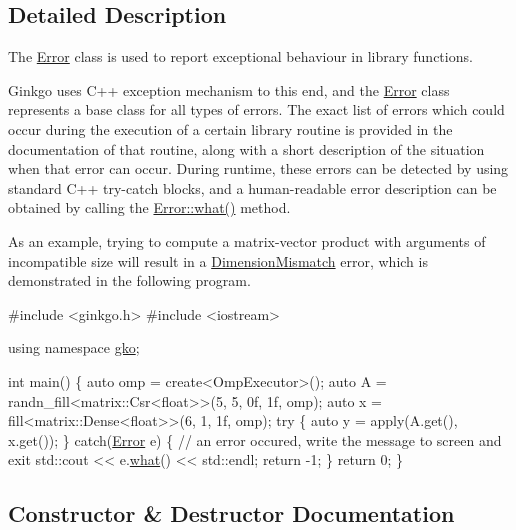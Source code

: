 \subsection{Detailed Description}
The \hyperlink{classgko_1_1Error}{Error} class is used to report exceptional behaviour in library functions. 

Ginkgo uses C++ exception mechanism to this end, and the \hyperlink{classgko_1_1Error}{Error} class represents a base class for all types of errors. The exact list of errors which could occur during the execution of a certain library routine is provided in the documentation of that routine, along with a short description of the situation when that error can occur. During runtime, these errors can be detected by using standard C++ try-\/catch blocks, and a human-\/readable error description can be obtained by calling the \hyperlink{classgko_1_1Error_a38cf4e9e4463088091a344f218c2dd8f}{Error\+::what()} method.

As an example, trying to compute a matrix-\/vector product with arguments of incompatible size will result in a \hyperlink{classgko_1_1DimensionMismatch}{Dimension\+Mismatch} error, which is demonstrated in the following program.


\begin{DoxyCode}
\textcolor{preprocessor}{#include <ginkgo.h>}
\textcolor{preprocessor}{#include <iostream>}

\textcolor{keyword}{using namespace }\hyperlink{namespacegko}{gko};

\textcolor{keywordtype}{int} main()
\{
    \textcolor{keyword}{auto} omp = create<OmpExecutor>();
    \textcolor{keyword}{auto} A = randn\_fill<matrix::Csr<float>>(5, 5, 0f, 1f, omp);
    \textcolor{keyword}{auto} x = fill<matrix::Dense<float>>(6, 1, 1f, omp);
    \textcolor{keywordflow}{try} \{
        \textcolor{keyword}{auto} y = apply(A.get(), x.get());
    \} \textcolor{keywordflow}{catch}(\hyperlink{classgko_1_1Error}{Error} e) \{
        \textcolor{comment}{// an error occured, write the message to screen and exit}
        std::cout << e.\hyperlink{classgko_1_1Error_a38cf4e9e4463088091a344f218c2dd8f}{what}() << std::endl;
        \textcolor{keywordflow}{return} -1;
    \}
    \textcolor{keywordflow}{return} 0;
\}
\end{DoxyCode}
 

\subsection{Constructor \& Destructor Documentation}
\mbox{\label{classgko_1_1Error_a750493241a840d96cafbf9c84cfd4f52}} 
